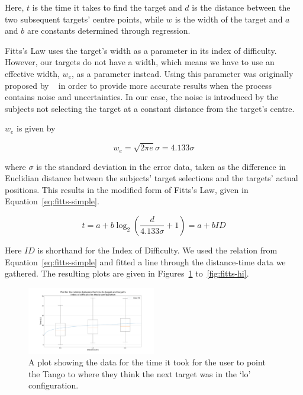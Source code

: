 \documentclass[format=sigconf, review=true, screen=true, anonymous=true]{acmart}
\begin{document}
Here, $t$ is the time it takes to find the target and $d$ is the distance between the two subsequent targets' centre points, while $w$ is the width of the target and $a$ and $b$ are constants determined through regression.

Fitts's Law uses the target's width as a parameter in its index of difficulty. However, our targets do not have a width, which means we have to use an effective width, $w_e$, as a parameter instead. Using this parameter was originally proposed by \citeauthor{mackenzie1992fitts}~\cite{mackenzie1992fitts} in order to provide more accurate results when the process contains noise and uncertainties. In our case, the noise is introduced by the subjects not selecting the target at a constant distance from the target's centre. 

$w_e$ is given by 

\[
  w_e = \sqrt{2\pi e}\sigma = 4.133\sigma
\]

where $\sigma$ is the standard deviation in the error data, taken as the difference in Euclidian distance between the subjects' target selections and the targets' actual positions. This results in the modified form of Fitts's Law, given in Equation~\ref{eq:fitts-simple}.

\begin{equation}
  \label{eq:fitts-simple}
  t = a + b\log_2\left(\frac{d}{4.133\sigma} + 1\right) = a + b ID
\end{equation}

Here $ID$ is shorthand for the Index of Difficulty. We used the relation from Equation~\ref{eq:fitts-simple} and fitted a line through the distance-time data we gathered. The resulting plots are given in Figures~\ref{fig:fitts-lo} to~\ref{fig:fitts-hi}. 

\begin{figure}
  \centering
  \includegraphics[width=0.5\textwidth]{figures/fitts_lo.png}
  \caption{A plot showing the data for the time it took for the user to point the Tango to where they think the next target was in the `lo' configuration. }
  \label{fig:fitts-lo}
\end{figure}
\end{document}
